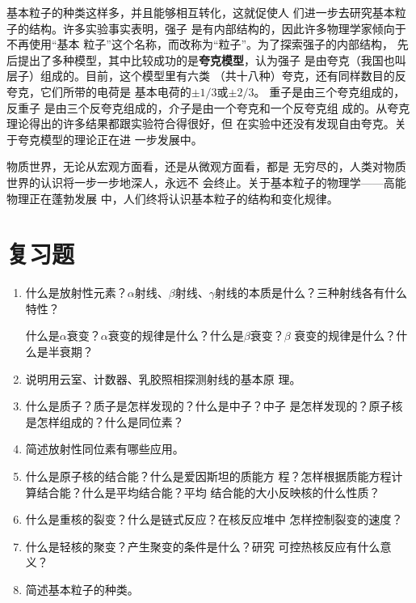 基本粒子的种类这样多，并且能够相互转化，这就促使人
们进一步去研究基本粒子的结构。许多实验事实表明，强子
是有内部结构的，因此许多物理学家倾向于不再使用“基本
粒子”这个名称，而改称为“粒子”。为了探索强子的内部结构，
先后提出了多种模型，其中比较成功的是\textbf{夸克模型}，认为强子
是由夸克（我国也叫层子）组成的。目前，这个模型里有六类
（共十八种）夸克，还有同样数目的反夸克，它们所带的电荷是
基本电荷的$\pm1/3$或$\pm 2/3$。
重子是由三个夸克组成的，反重子
是由三个反夸克组成的，介子是由一个夸克和一个反夸克组
成的。从夸克理论得出的许多结果都跟实验符合得很好，但
在实验中还没有发现自由夸克。关于夸克模型的理论正在进
一步发展中。

物质世界，无论从宏观方面看，还是从微观方面看，都是
无穷尽的，人类对物质世界的认识将一步一步地深人，永远不
会终止。关于基本粒子的物理学——高能物理正在蓬勃发展
中，人们终将认识基本粒子的结构和变化规律。


\section*{复习题}
\begin{enumerate}
    \item 什么是放射性元素？$\alpha$射线、$\beta$射线、$\gamma$射线的本质是什么？三种射线各有什么特性？

    什么是$\alpha$衰变？$\alpha$衰变的规律是什么？什么是$\beta$衰变？$\beta$
    衰变的规律是什么？什么是半衰期？
    \item 说明用云室、计数器、乳胶照相探测射线的基本原
    理。
    \item 什么是质子？质子是怎样发现的？什么是中子？中子
    是怎样发现的？原子核是怎样组成的？什么是同位素？
    \item 简述放射性同位素有哪些应用。
    \item 什么是原子核的结合能？什么是爱因斯坦的质能方
    程？怎样根据质能方程计算结合能？什么是平均结合能？平均
    结合能的大小反映核的什么性质？
    \item 什么是重核的裂变？什么是链式反应？在核反应堆中
    怎样控制裂变的速度？
    \item 什么是轻核的聚变？产生聚变的条件是什么？研究
    可控热核反应有什么意义？
    \item 简述基本粒子的种类。
\end{enumerate}


